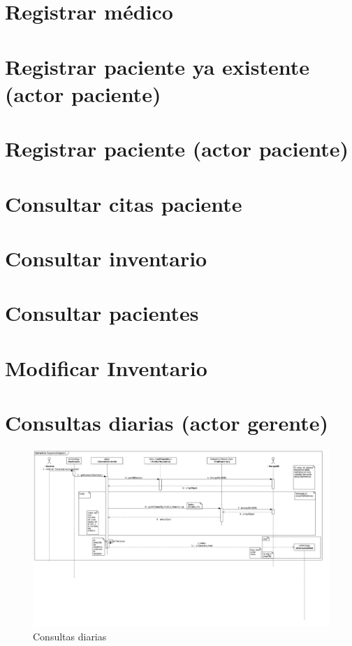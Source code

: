\section{Registrar médico}

\section{Registrar paciente ya existente (actor paciente)}

\section{Registrar paciente (actor paciente)}


\section{Consultar citas paciente}
\section{Consultar inventario}
\section{Consultar pacientes}
\section{Modificar Inventario}

\newpage
\section{Consultas diarias (actor gerente)}
\begin{figure}[htbp!]
		\centering
			\includegraphics[width=1\textwidth]{uml/DiagramasSecuencia/RubenMurga/getConsultasDia}
		\caption{Consultas diarias}
	\end{figure}

